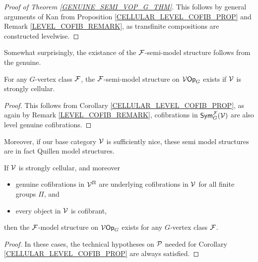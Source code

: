 \documentclass[a4paper,10pt]{article}%
\begin{document}
\begin{proof}[Proof of Theorem \ref{GENUINE_SEMI_VOP_G_THM}] 
  This follows by general arguments of Kan \cite[11.6.1]{Hi03} from Proposition \ref{CELLULAR_LEVEL_COFIB_PROP} and Remark \ref{LEVEL_COFIB_REMARK}, as transfinite compositions are constructed levelwise. 
\end{proof} 


Somewhat surprisingly, the existance of the $\F$-semi-model structure follows from the genuine. 
\begin{corollary} 
  For any $G$-vertex class $\F$, the $\F$-semi-model structure on $\V\Op_G$ exists if $\V$ is strongly cellular.  
\end{corollary} 
\begin{proof} 
  This follows from Corollary \ref{CELLULAR_LEVEL_COFIB_PROP}, as again by Remark \ref{LEVEL_COFIB_REMARK}, cofibrations in $\Sym_G^\F(\V)$ are also level genuine cofibrations. %
\end{proof} 

Moreover, if our base category $\V$ is sufficiently nice, these semi model structures are in fact Quillen model structures. 
\begin{theorem} 
  \label{GENUINE_OP_Q_MODEL_THM}
  If $\V$ is strongly cellular, and moreover
  \begin{itemize}
  \item genuine cofibrations in $\V^\Pi$ are underlying cofibrations in $\V$ for all finite groups $\Pi$, and
  \item every object in $\V$ is cofibrant,
  \end{itemize}
  then the $\F$-model structure on $\V\Op_G$ exists for any $G$-vertex class $\F$.
\end{theorem} 
\begin{proof} 
  In these cases, the technical hypotheses on $\P$ needed for Corollary \ref{CELLULAR_LEVEL_COFIB_PROP} are always satisfied. 
\end{proof} 
\end{document}
